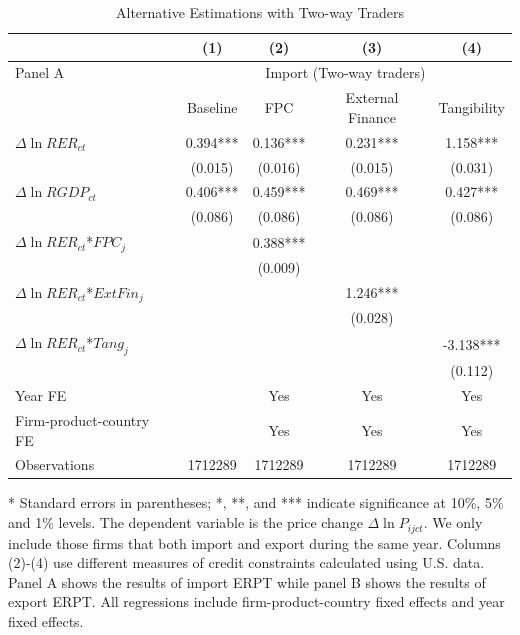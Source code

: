 \documentclass[12pt]{article}
\begin{document}
\begin{table}[htbp]
	\centering
	\caption{Alternative Estimations with Two-way Traders}
	\begin{threeparttable}
		\begin{tabular}{lcccc}
			\toprule
			& (1)   & (2)   & (3)   & (4) \\
			\midrule
			Panel A & \multicolumn{4}{c}{Import (Two-way traders)} \\
			& Baseline & FPC   & External Finance & Tangibility \\
			\midrule
			$\Delta \ln RER_{ct}$ & 0.394*** & 0.136*** & 0.231*** & 1.158*** \\
			& (0.015) & (0.016) & (0.015) & (0.031) \\
			$\Delta \ln RGDP_{ct}$ & 0.406*** & 0.459*** & 0.469*** & 0.427*** \\
			& (0.086) & (0.086) & (0.086) & (0.086) \\
			$\Delta \ln RER_{ct}$*$FPC_{j}$ &       & 0.388*** &       &  \\
			&       & (0.009) &       &  \\
			$\Delta \ln RER_{ct}$*$ExtFin_{j}$ &       &       & 1.246*** &  \\
			&       &       & (0.028) &  \\
			$\Delta \ln RER_{ct}$*$Tang_{j}$ &       &       &       & -3.138*** \\
			&       &       &       & (0.112) \\
			Year FE  &       & Yes   & Yes   & Yes \\
			Firm-product-country FE &       & Yes   & Yes   & Yes \\
			Observations & 1712289 & 1712289 & 1712289 & 1712289 \\
			\bottomrule
		\end{tabular}
		
		\begin{tablenotes}
			\footnotesize
			\item[*] Standard errors in parentheses; *, **, and *** indicate significance at 10\%, 5\% and 1\% levels. The dependent variable is the price change $\Delta \ln P_{ijct}$. We only include those firms that both import and export during the same year. Columns (2)-(4) use different measures of credit constraints calculated using U.S. data. Panel A shows the results of import ERPT while panel B shows the results of export ERPT. All regressions include firm-product-country fixed effects and year fixed effects.
		\end{tablenotes}
	\end{threeparttable}
	\label{tab.alt.twoway}
\end{table}
\end{document}
